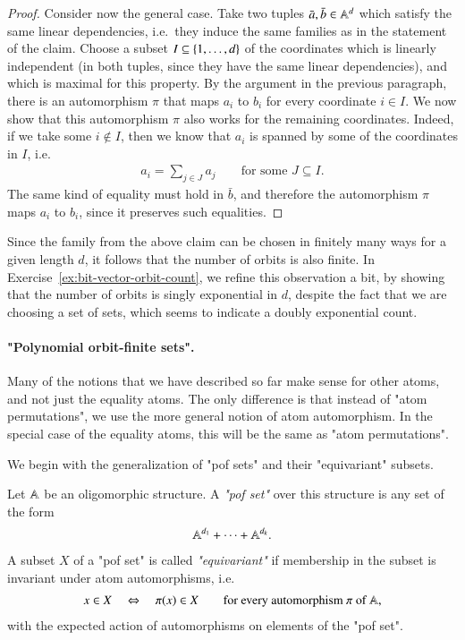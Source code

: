 \begin{myexample}
\begin{proof}
		Consider now the general case. Take two tuples $\bar a, \bar b \in \mathbb A^d$ which satisfy the same linear dependencies, i.e.~they induce the same families as in the statement of the claim. Choose a subset $I \subseteq \{1,\ldots,d\}$ of the coordinates which is linearly independent (in both tuples, since they have the same linear dependencies), and which is maximal for this property. By the argument in the previous paragraph, there is an automorphism $\pi$ that maps  $a_i$ to $b_i$ for every coordinate $i \in I$. We now show that this automorphism $\pi$  also works for the remaining coordinates. Indeed, if we take some $i \not \in I$, then we know that $a_i$ is spanned by some of the coordinates in $I$, i.e.
		\begin{align*}
		a_i = \sum_{j \in J} a_j  \qquad  \text{for some $J \subseteq I$}.
		\end{align*}
		The same kind of equality must hold in $\bar b$, and therefore the automorphism $\pi$ maps $a_i$ to $b_i$, since it preserves such equalities.
	\end{proof}

	 Since the family from the above claim can be chosen in finitely many ways for a given length $d$, it follows that the number of orbits is also finite. In Exercise~\ref{ex:bit-vector-orbit-count}, we refine this observation a bit, by showing that the number of orbits is singly exponential in $d$, despite the fact that we are choosing a set of sets, which seems to indicate a doubly exponential count.
\end{myexample}





\paragraph*{"Polynomial orbit-finite sets".} Many of the notions that we have described so far make sense for other atoms, and not just the equality atoms. The only difference is that instead of "atom permutations", we use the more general notion of atom automorphism. In the special case of the equality atoms, this will be the same as "atom permutations". 

We begin with the generalization of "pof sets" and their "equivariant" subsets. 

\begin{definition}
    Let $\mathbb A$ be an oligomorphic  structure. A \emph{"pof set"} over this structure is any set of the form 
    \begin{align*}
    \mathbb A^{d_1} + \cdots + \mathbb A^{d_k}.
    \end{align*}
    A subset $X$ of a  "pof set" is called \emph{"equivariant"} if membership in the subset is invariant under atom automorphisms, i.e.
    \begin{align*}
    x \in X \quad \Leftrightarrow \quad \pi(x) \in X \qquad \text{for every automorphism $\pi$ of $\mathbb A$},
    \end{align*}
    with the expected action of automorphisms on elements of the "pof set".
\end{definition}

